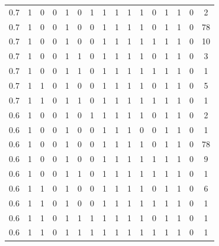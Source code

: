 \documentclass[12pt, letter]{article}\usepackage[]{graphicx}\usepackage[]{color}
\begin{document}
\begin{table}[ht]
{\begin{tabular}{|c|cccccccccccccc|c|}
   \hline
0.7 & 1 & 0 & 0 & 1 & 0 & 1 & 1 & 1 & 1 & 1 & 0 & 1 & 1 & 0 & 2 \\ 
  0.7 & 1 & 0 & 0 & 1 & 0 & 0 & 1 & 1 & 1 & 1 & 0 & 1 & 1 & 0 & 78 \\ 
  0.7 & 1 & 0 & 0 & 1 & 0 & 0 & 1 & 1 & 1 & 1 & 1 & 1 & 1 & 0 & 10 \\ 
  0.7 & 1 & 0 & 0 & 1 & 1 & 0 & 1 & 1 & 1 & 1 & 0 & 1 & 1 & 0 & 3 \\ 
  0.7 & 1 & 0 & 0 & 1 & 1 & 0 & 1 & 1 & 1 & 1 & 1 & 1 & 1 & 0 & 1 \\ 
  0.7 & 1 & 1 & 0 & 1 & 0 & 0 & 1 & 1 & 1 & 1 & 0 & 1 & 1 & 0 & 5 \\ 
  0.7 & 1 & 1 & 0 & 1 & 1 & 0 & 1 & 1 & 1 & 1 & 1 & 1 & 1 & 0 & 1 \\ 
   \hline
0.6 & 1 & 0 & 0 & 1 & 0 & 1 & 1 & 1 & 1 & 1 & 0 & 1 & 1 & 0 & 2 \\ 
  0.6 & 1 & 0 & 0 & 1 & 0 & 0 & 1 & 1 & 1 & 0 & 0 & 1 & 1 & 0 & 1 \\ 
  0.6 & 1 & 0 & 0 & 1 & 0 & 0 & 1 & 1 & 1 & 1 & 0 & 1 & 1 & 0 & 78 \\ 
  0.6 & 1 & 0 & 0 & 1 & 0 & 0 & 1 & 1 & 1 & 1 & 1 & 1 & 1 & 0 & 9 \\ 
  0.6 & 1 & 0 & 0 & 1 & 1 & 0 & 1 & 1 & 1 & 1 & 1 & 1 & 1 & 0 & 1 \\ 
  0.6 & 1 & 1 & 0 & 1 & 0 & 0 & 1 & 1 & 1 & 1 & 0 & 1 & 1 & 0 & 6 \\ 
  0.6 & 1 & 1 & 0 & 1 & 0 & 0 & 1 & 1 & 1 & 1 & 1 & 1 & 1 & 0 & 1 \\ 
  0.6 & 1 & 1 & 0 & 1 & 1 & 1 & 1 & 1 & 1 & 1 & 0 & 1 & 1 & 0 & 1 \\ 
  0.6 & 1 & 1 & 0 & 1 & 1 & 1 & 1 & 1 & 1 & 1 & 1 & 1 & 1 & 0 & 1 \\ 
   \hline
\end{tabular}
}
\end{table}
\end{document}
